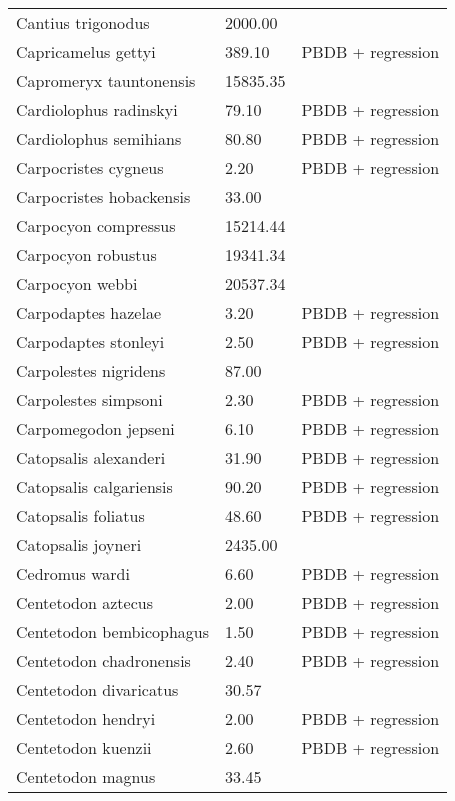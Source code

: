 \documentclass{article}
\begin{document}
\begin{center}
\begin{longtable}{p{} p{} p{}}
    Cantius trigonodus & 2000.00 & \cite{Soligo2006} \\ 
    Capricamelus gettyi & 389.10 & PBDB + regression \\ 
    Capromeryx tauntonensis & 15835.35 & \cite{Tomiya2013} \\ 
    Cardiolophus radinskyi & 79.10 & PBDB + regression \\ 
    Cardiolophus semihians & 80.80 & PBDB + regression \\ 
    Carpocristes cygneus & 2.20 & PBDB + regression \\ 
    Carpocristes hobackensis & 33.00 & \cite{Soligo2006} \\ 
    Carpocyon compressus & 15214.44 & \cite{Tomiya2013} \\ 
    Carpocyon robustus & 19341.34 & \cite{Tomiya2013} \\ 
    Carpocyon webbi & 20537.34 & \cite{Tomiya2013} \\ 
    Carpodaptes hazelae & 3.20 & PBDB + regression \\ 
    Carpodaptes stonleyi & 2.50 & PBDB + regression \\ 
    Carpolestes nigridens & 87.00 & \cite{Scott2003a} \\ 
    Carpolestes simpsoni & 2.30 & PBDB + regression \\ 
    Carpomegodon jepseni & 6.10 & PBDB + regression \\ 
    Catopsalis alexanderi & 31.90 & PBDB + regression \\ 
    Catopsalis calgariensis & 90.20 & PBDB + regression \\ 
    Catopsalis foliatus & 48.60 & PBDB + regression \\ 
    Catopsalis joyneri & 2435.00 & \cite{Wilson2012} \\ 
    Cedromus wardi & 6.60 & PBDB + regression \\ 
    Centetodon aztecus & 2.00 & PBDB + regression \\ 
    Centetodon bembicophagus & 1.50 & PBDB + regression \\ 
    Centetodon chadronensis & 2.40 & PBDB + regression \\ 
    Centetodon divaricatus & 30.57 & \cite{Tomiya2013} \\ 
    Centetodon hendryi & 2.00 & PBDB + regression \\ 
    Centetodon kuenzii & 2.60 & PBDB + regression \\ 
    Centetodon magnus & 33.45 & \cite{Tomiya2013} \\ 

\end{longtable}
\end{center}
\end{document}
